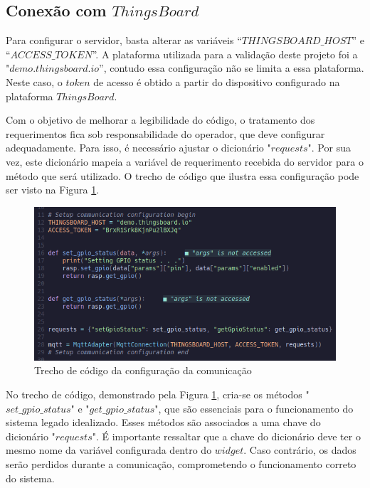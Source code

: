 \documentclass{ecatfg}
\begin{document}
\subsection{Conexão com $ThingsBoard$}
Para configurar o servidor, basta alterar as variáveis “$THINGSBOARD\_HOST$” e “$ACCESS\_TOKEN$”. A plataforma utilizada para a validação deste projeto foi a "$demo.thingsboard.io$”, contudo essa configuração não se limita a essa plataforma. Neste caso, o $token$ de acesso é obtido a partir do dispositivo configurado na plataforma $ThingsBoard$. \par

Com o objetivo de melhorar a legibilidade do código, o tratamento dos requerimentos fica sob responsabilidade do operador, que deve configurar adequadamente. Para isso, é necessário ajustar o dicionário "$requests$". Por sua vez, este dicionário mapeia a variável de requerimento recebida do servidor para o método que será utilizado. O trecho de código que ilustra essa configuração pode ser visto na Figura \ref{fig:13}.

\begin{figure}[!htb]
    \centering
    \includegraphics[scale=0.30]{Figuras/comunicação_framework.png}
    \caption{Trecho de código da configuração da comunicação}
    \label{fig:13}
\end{figure}

No trecho de código, demonstrado pela Figura \ref{fig:13}, cria-se os métodos "$set\_gpio\_status$" e "$get\_gpio\_status$", que são essenciais para o funcionamento do sistema legado idealizado. Esses métodos são associados a uma chave do dicionário "$requests$". É importante ressaltar que a chave do dicionário deve ter o mesmo nome da variável configurada dentro do $widget$. Caso contrário, os dados serão perdidos durante a comunicação, comprometendo o funcionamento correto do sistema. \par
\end{document}
